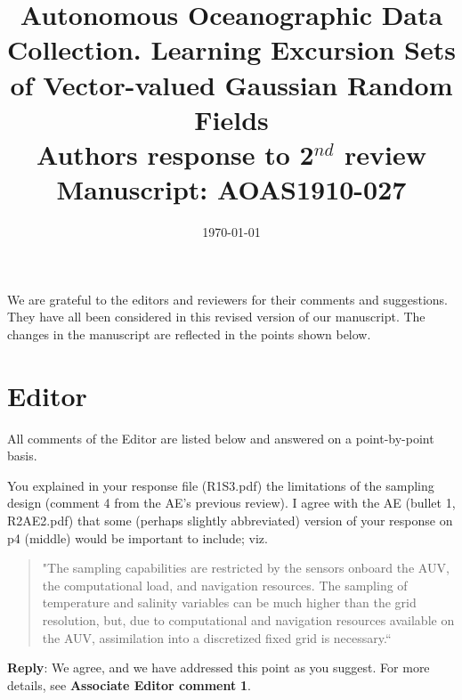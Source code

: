 \documentclass[a4paper]{article}
\newcounter{reviewer}
\def\aecom{\textbf{Associate Editor comment }}
\def\reply{\textbf{Reply}}
\begin{document}
\title{Autonomous Oceanographic Data Collection. Learning Excursion Sets of Vector-valued Gaussian Random Fields
  \\\vspace{5mm}
 Authors response to 2$^{nd}$ review
  \\\vspace{5mm}
\small{Manuscript: AOAS1910-027}}
\author{ }

\date{\today}

\maketitle

We are grateful to the editors and reviewers for their comments and suggestions. They have all been considered in this revised version of our manuscript. The changes in the manuscript are reflected in the points shown below.\\

\par \vspace{1em}


\section*{Editor}
All comments of the Editor are listed below and answered on a point-by-point basis.

\vspace{5mm}
 You explained in your response file (R1S3.pdf) the limitations of the sampling design (comment 4 from the AE's previous review). I agree with the AE (bullet 1, R2AE2.pdf) that some (perhaps slightly abbreviated) version of your response on p4 (middle) would be important to include; viz.

\begin{quote}
"The sampling capabilities are restricted by the sensors onboard the AUV, the computational load, and navigation resources. The sampling of temperature and salinity variables can be much higher than the grid resolution, but, due to computational and navigation resources available on the AUV, assimilation into a discretized fixed grid is necessary.`` 
\end{quote}


\reply: We agree, and we have addressed this point as you suggest. For more details, see \aecom \textbf{1}. 
 
\end{document}
